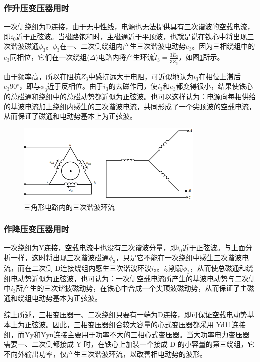 \documentclass{book}
\begin{document}
\subsubsection{作升压变压器用时}
一次侧绕组为D连接，由于无中性线，电源也无法提供具有三次谐波的空载电流，即${{i}_{0}}$近于正弦波。当磁路饱和时，主磁通近于平顶波，也就是说在铁心中将出现三次谐波磁通${{\phi }_{3}}$。${{\phi }_{3}}$在一、二次侧绕组内产生三次谐波电动势${{e}_{3}}$。因为三相绕组中的${{e}_{3}}$同相位，它们在一次绕组($\Delta $)电路内将产生环流${{\dot{I}}_{3}}=\frac{3{{{\dot{E}}}_{3}}}{3{{{\dot{Z}}}_{3}}}$，如图\ref{fig_4.12}所示。

由于频率高，所以在阻抗${{Z}_{3}}$中感抗远大于电阻，可近似地认为${{i}_{3}}$在相位上滞后${{e}_{3}}90{}^\circ $，即与${{\phi }_{3}}$近于反相位。由于${{i}_{3}}$的去磁作用，使${{i}_{3}}$和${{e}_{3}}$都变得很小，结果使铁心的总磁通和绕组中的总磁动势都近似为正弦波。也可以这样认为：电源向每相供给的基波电流加上绕组内感生的三次谐波电流，共同形成了一个尖顶波的空载电流，从而保证了磁通和电动势基本上为正弦波。

\begin{figure}[H]
	\centering
	\includegraphics[width=0.80\textwidth]{4-12g.png}
	\caption{三角形电路内的三次谐波环流}
	\label{fig_4.12}
\end{figure}

\subsubsection{作降压变压器用时}
一次绕组为Y连接，空载电流中也没有三次谐波分量，即${{i}_{0}}$近于正弦波。与上面分析一样，这时将出现三次谐波磁通${{\phi }_{3}}$，只是它不能在一次绕组中感生三次谐波电流，而在二次侧 D连接绕组内感生三次谐波环波${{i}_{3}}$。${{i}_{3}}$削弱${{\phi }_{3}}$，从而使总磁通和绕组电动势近似为正弦波，也可认为：一次侧空载电流所产生的基波电动势与二次侧中${{i}_{3}}$所产生的三次谐披磁动势，在铁心中合成一个尖顶波磁动势，从而保证了主磁通和绕组电动势基本为正弦波。

综上所述，三相变压器一、二次绕组只要有一端为D连接，即可保证空载电动势基本上为正弦波。因此，三相变压器组合较大容量的心式变压器都采用 Yd11连接组，而Yy和Yyn连接主要用于功率不大的三相心式变压器。当大功率电力变压器需要一、二次侧都接成 Y 时，在铁心上加装一个接成 D 的小容量的第三绕组，它不向外输出功率，仅产生三次谐波环流，以改善相电动势的波形。
\end{document}

